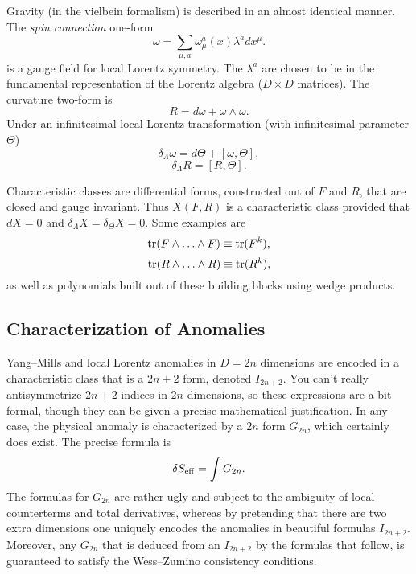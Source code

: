 \documentclass[a4paper,12pt]{article}
\begin{document}
Gravity (in the vielbein formalism) is described in an almost identical manner. The
{\it spin connection} one-form
\begin{equation}
\omega = \sum_{\mu, a} \omega^{a}_{\mu}(x) \lambda^{a} dx^{\mu}.
\end{equation}
is a gauge field for local Lorentz symmetry. The $\lambda^a$ are chosen to be in
the fundamental representation of the Lorentz algebra ($D\times D$ matrices).
The curvature two-form is
\begin{equation}
R =  d\omega + \omega\wedge \omega.
\end{equation}
Under an infinitesimal local Lorentz transformation (with
infinitesimal parameter $\Theta$)
\begin{equation}
\delta_{\Lambda} \omega = d\Theta + [\omega, \Theta],
\end{equation}
\begin{equation}
\delta_{\Lambda} R = [R, \Theta].
\end{equation}

Characteristic classes are differential forms, constructed out of
$F$ and $R$, that are closed and gauge invariant. Thus $X(F,R)$ is
a characteristic class provided that $dX=0$ and $\delta_{\Lambda}
X = \delta _{\Theta} X =0$. Some examples are
\begin{equation}
{\rm tr}(F\wedge \ldots \wedge F) \equiv {\rm tr}(F^k),
\end{equation}
\begin{equation}
{\rm tr}(R\wedge \ldots \wedge R) \equiv {\rm tr}(R^k),
\end{equation}
as well as polynomials built out of these building blocks using wedge products.

\subsection{Characterization of Anomalies}
Yang--Mills and local Lorentz anomalies in $D=2n$ dimensions are
encoded in a characteristic class that is a $2n+2$ form, denoted
$I_{2n+2}$.  You can't really antisymmetrize $2n+2$ indices in
$2n$ dimensions, so these expressions are a bit formal, though
they can be given a precise mathematical justification. In any
case, the physical anomaly is characterized by a $2n$ form $G_{2n}$,
which certainly does exist. The precise formula is
\begin{equation}
\delta S_{\rm eff} = \int G_{2n}.
\end{equation}
The formulas for $G_{2n}$ are rather ugly and subject to the
ambiguity of local counterterms and total derivatives, 
whereas by pretending that there
are two extra dimensions one uniquely encodes the anomalies in
beautiful formulas $I_{2n+2}$. Moreover, any $G_{2n}$ that is
deduced from an $I_{2n+2}$ by the formulas that follow,  is
guaranteed to satisfy the Wess--Zumino consistency conditions.
\end{document}
